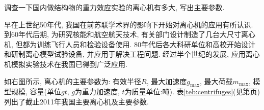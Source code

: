 \begin{problem}[21]
调查一下国内做结构物的重力效应实验的离心机有多大, 写出主要参数.
\end{problem}

\vspace{10pt}
早在上世纪50年代, 我国在前苏联学术界的影响下开始对离心机的应用有所认识. 到60年代后期, 为研究核能和航空航天技术, 有关部门设计制造了几台大尺寸离心机, 但都为训练飞行人员和检验设备使用. 80年代后各大科研单位和高校开始设计和研制离心模型试验设备, 并应用于解决工程问题\cite{centrifugesParameters}. 经过半个世纪的发展, 应用离心机模拟实验技术在我国已得到广泛应用.

\vspace{-14pt}
\noindent\begin{minipage}[b]{0.55\linewidth}
\indent 如右图所示, 离心机的主要参数为: 有效半径$R$, 最大加速度$g_{\max}$, 最大荷载$m_{\max}$, 模型规模, 容量(单位$gt$, $g$为重力加速度, $t$为质量单位:吨). 表\ref{teb:centrifuges}(见第\pageref{teb:centrifuges}页)列出了截止2011年我国主要离心机及主要参数.
\end{minipage}
\begin{minipage}[b]{0.45\linewidth}
\begin{center}

\end{center}
\end{minipage}


